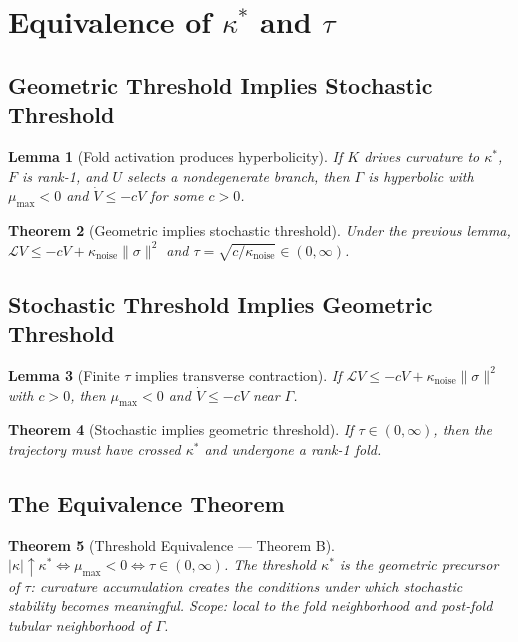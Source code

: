 \documentclass[11pt]{article}
\theoremstyle{boxed}
\newtheorem{theorem}{Theorem}[section]
\newtheorem{lemma}[theorem]{Lemma}
\begin{document}
\section{Equivalence of $\kappa^{*}$ and $\tau$}

\subsection{Geometric Threshold Implies Stochastic Threshold}

\begin{lemma}[Fold activation produces hyperbolicity]
If $K$ drives curvature to $\kappa^{*}$, $F$ is rank-1, and $U$ selects a
nondegenerate branch, then $\Gamma$ is hyperbolic with $\mu_{\max} < 0$ and
$\dot{V} \leq -cV$ for some $c > 0$.
\end{lemma}

\begin{theorem}[Geometric implies stochastic threshold]
Under the previous lemma, $\mathcal{L}V \leq -cV + \kappa_{\mathrm{noise}}\|\sigma\|^{2}$
and $\tau = \sqrt{c/\kappa_{\mathrm{noise}}} \in (0,\infty)$.
\end{theorem}

\subsection{Stochastic Threshold Implies Geometric Threshold}

\begin{lemma}[Finite $\tau$ implies transverse contraction]
If $\mathcal{L}V \leq -cV + \kappa_{\mathrm{noise}}\|\sigma\|^{2}$ with $c > 0$, then
$\mu_{\max} < 0$ and $\dot{V} \leq -cV$ near $\Gamma$.
\end{lemma}

\begin{theorem}[Stochastic implies geometric threshold]
If $\tau \in (0,\infty)$, then the trajectory must have crossed $\kappa^{*}$ and
undergone a rank-1 fold.
\end{theorem}

\subsection{The Equivalence Theorem}

\begin{theorem}[Threshold Equivalence --- Theorem B]
$|\kappa| \uparrow \kappa^{*} \iff \mu_{\max} < 0 \iff \tau \in (0,\infty)$. The
threshold $\kappa^{*}$ is the geometric precursor of $\tau$: curvature accumulation
creates the conditions under which stochastic stability becomes meaningful.
Scope: local to the fold neighborhood and post-fold tubular neighborhood of $\Gamma$.
\end{theorem}
\end{document}
